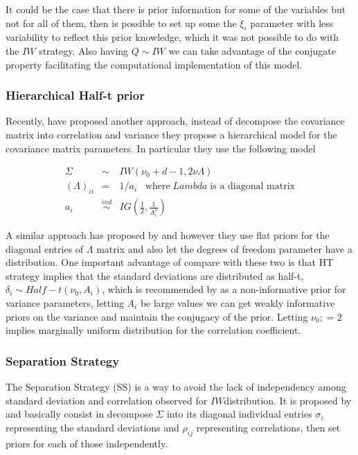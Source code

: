 \documentclass{article}
\begin{document}
 It could be the case that there is prior information for some of the variables but not for all of them, then is possible to set up some the $\xi_i$ parameter with less variability to reflect this prior knowledge, which it was not possible to do with the $IW$ strategy. Also having $Q\sim IW$ we can take advantage of the conjugate property facilitating the computational implementation of this model. 

\subsubsection{Hierarchical Half-t prior}

Recently, \cite{huang2013simple} have proposed another approach, instead of decompose the covariance matrix into correlation and variance they propose a hierarchical model for the covariance matrix parameters. In particular they use the following model 

\begin{eqnarray}
\nonumber \Sigma &\sim& IW( \nu_0 + d - 1 ,  2\nu\Lambda) \\
\nonumber  (\Lambda)_{ii} &=& 1/a_i \;\; \; \mbox{where} \; Lambda \; \mbox{is a diagonal matrix} \\
 a_i & \stackrel{ind} \sim& IG(\frac{1}{2} , \frac{1}{A_i^2})
\label{eq:ht}
\end{eqnarray}

A similar approach has proposed by \cite{daniels1999} and \cite{matilde} however they use flat priors for the diagonal entries of $\Lambda$ matrix and also let the degrees of freedom parameter have a distribution. One important advantage of \cite{huang2013simple} compare with these two is that HT strategy implies that the standard deviations are distributed as half-t, $\delta_i \sim Half-t(\nu_0, A_i)$, which is recommended by \cite{gelman2006prior} as a non-informative prior for variance parameters, letting $A_i$ be large values we can get weakly informative priors on the variance and maintain the conjugacy of the prior.  Letting $\nu_0;=2$ implies marginally uniform distribution for the correlation coefficient. 

\subsubsection{Separation Strategy \label{ss.sec} }

The Separation Strategy (SS) is a way to avoid the lack of independency among standard deviation and correlation observed for $IW$distribution. It is proposed by \cite{barnard2000} and basically consist in decompose $\Sigma$ into its diagonal individual entries $\sigma_{i}$ representing the standard deviations and $\rho_{ij}$ representing correlations, then set priors for each of those independently.  
\end{document}
